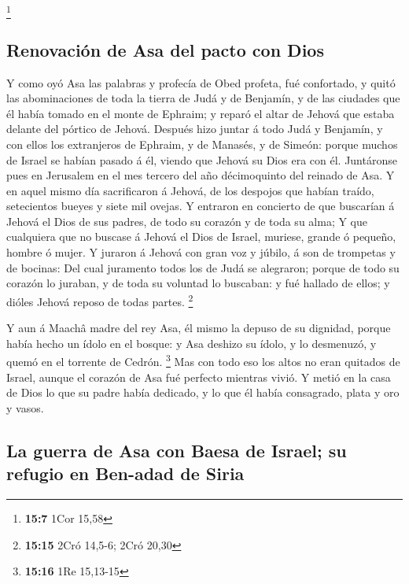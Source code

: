 \footnote{\textbf{15:7} 1Cor 15,58}

\hypertarget{renovaciuxf3n-de-asa-del-pacto-con-dios}{%
\subsection{Renovación de Asa del pacto con
Dios}\label{renovaciuxf3n-de-asa-del-pacto-con-dios}}

 Y como oyó Asa las palabras y profecía de Obed profeta, fué
confortado, y quitó las abominaciones de toda la tierra de Judá y de
Benjamín, y de las ciudades que él había tomado en el monte de Ephraim;
y reparó el altar de Jehová que estaba delante del pórtico de Jehová.
 Después hizo juntar á todo Judá y Benjamín, y con ellos los
extranjeros de Ephraim, y de Manasés, y de Simeón: porque muchos de
Israel se habían pasado á él, viendo que Jehová su Dios era con él.
 Juntáronse pues en Jerusalem en el mes tercero del año
décimoquinto del reinado de Asa.  Y en aquel mismo día
sacrificaron á Jehová, de los despojos que habían traído, setecientos
bueyes y siete mil ovejas.  Y entraron en concierto de que
buscarían á Jehová el Dios de sus padres, de todo su corazón y de toda
su alma;  Y que cualquiera que no buscase á Jehová el Dios
de Israel, muriese, grande ó pequeño, hombre ó mujer.  Y
juraron á Jehová con gran voz y júbilo, á son de trompetas y de bocinas:
 Del cual juramento todos los de Judá se alegraron; porque
de todo su corazón lo juraban, y de toda su voluntad lo buscaban: y fué
hallado de ellos; y dióles Jehová reposo de todas partes. \footnote{\textbf{15:15}
  2Cró 14,5-6; 2Cró 20,30}

 Y aun á Maachâ madre del rey Asa, él mismo la depuso de su
dignidad, porque había hecho un ídolo en el bosque: y Asa deshizo su
ídolo, y lo desmenuzó, y quemó en el torrente de Cedrón. \footnote{\textbf{15:16}
  1Re 15,13-15}  Mas con todo eso los altos no eran
quitados de Israel, aunque el corazón de Asa fué perfecto mientras
vivió.  Y metió en la casa de Dios lo que su padre había
dedicado, y lo que él había consagrado, plata y oro y vasos.

\hypertarget{la-guerra-de-asa-con-baesa-de-israel-su-refugio-en-ben-adad-de-siria}{%
\subsection{La guerra de Asa con Baesa de Israel; su refugio en Ben-adad
de
Siria}\label{la-guerra-de-asa-con-baesa-de-israel-su-refugio-en-ben-adad-de-siria}}

